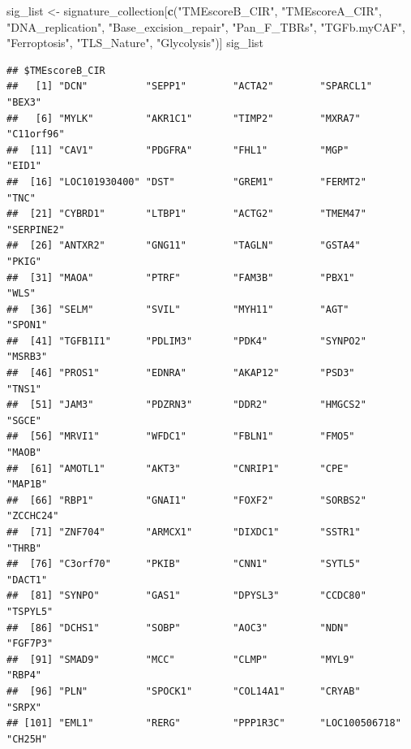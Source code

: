 \documentclass[
  12pt,
]{book}
\newenvironment{Shaded}{\begin{snugshade}}{\end{snugshade}}
\newcommand{\FunctionTok}[1]{\textcolor[rgb]{0.13,0.29,0.53}{\textbf{#1}}}
\newcommand{\NormalTok}[1]{#1}
\newcommand{\OtherTok}[1]{\textcolor[rgb]{0.56,0.35,0.01}{#1}}
\newcommand{\StringTok}[1]{\textcolor[rgb]{0.31,0.60,0.02}{#1}}
\begin{document}
\begin{Shaded}
\begin{Highlighting}[]
\NormalTok{sig\_list }\OtherTok{\textless{}{-}}\NormalTok{ signature\_collection[}\FunctionTok{c}\NormalTok{(}\StringTok{"TMEscoreB\_CIR"}\NormalTok{, }\StringTok{"TMEscoreA\_CIR"}\NormalTok{, }\StringTok{"DNA\_replication"}\NormalTok{, }\StringTok{"Base\_excision\_repair"}\NormalTok{,}
                                   \StringTok{"Pan\_F\_TBRs"}\NormalTok{, }\StringTok{"TGFb.myCAF"}\NormalTok{, }\StringTok{"Ferroptosis"}\NormalTok{, }\StringTok{"TLS\_Nature"}\NormalTok{, }\StringTok{"Glycolysis"}\NormalTok{)]}
\NormalTok{sig\_list}
\end{Highlighting}
\end{Shaded}

\begin{verbatim}
## $TMEscoreB_CIR
##   [1] "DCN"          "SEPP1"        "ACTA2"        "SPARCL1"      "BEX3"        
##   [6] "MYLK"         "AKR1C1"       "TIMP2"        "MXRA7"        "C11orf96"    
##  [11] "CAV1"         "PDGFRA"       "FHL1"         "MGP"          "EID1"        
##  [16] "LOC101930400" "DST"          "GREM1"        "FERMT2"       "TNC"         
##  [21] "CYBRD1"       "LTBP1"        "ACTG2"        "TMEM47"       "SERPINE2"    
##  [26] "ANTXR2"       "GNG11"        "TAGLN"        "GSTA4"        "PKIG"        
##  [31] "MAOA"         "PTRF"         "FAM3B"        "PBX1"         "WLS"         
##  [36] "SELM"         "SVIL"         "MYH11"        "AGT"          "SPON1"       
##  [41] "TGFB1I1"      "PDLIM3"       "PDK4"         "SYNPO2"       "MSRB3"       
##  [46] "PROS1"        "EDNRA"        "AKAP12"       "PSD3"         "TNS1"        
##  [51] "JAM3"         "PDZRN3"       "DDR2"         "HMGCS2"       "SGCE"        
##  [56] "MRVI1"        "WFDC1"        "FBLN1"        "FMO5"         "MAOB"        
##  [61] "AMOTL1"       "AKT3"         "CNRIP1"       "CPE"          "MAP1B"       
##  [66] "RBP1"         "GNAI1"        "FOXF2"        "SORBS2"       "ZCCHC24"     
##  [71] "ZNF704"       "ARMCX1"       "DIXDC1"       "SSTR1"        "THRB"        
##  [76] "C3orf70"      "PKIB"         "CNN1"         "SYTL5"        "DACT1"       
##  [81] "SYNPO"        "GAS1"         "DPYSL3"       "CCDC80"       "TSPYL5"      
##  [86] "DCHS1"        "SOBP"         "AOC3"         "NDN"          "FGF7P3"      
##  [91] "SMAD9"        "MCC"          "CLMP"         "MYL9"         "RBP4"        
##  [96] "PLN"          "SPOCK1"       "COL14A1"      "CRYAB"        "SRPX"        
## [101] "EML1"         "RERG"         "PPP1R3C"      "LOC100506718" "CH25H"       

\end{verbatim}
\end{document}
